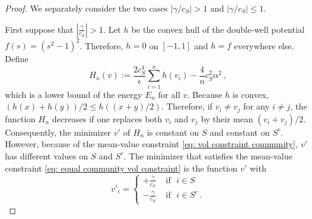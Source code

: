 \documentclass[10pt,a4paper]{amsart}
\def\ep{\epsilon}
\begin{document}
\begin{proof}

We separately consider the two cases $\left|{\gamma}/{c_S}\right| > 1$ and $\left|{\gamma}/{c_S}\right| \leq 1$. 

First suppose that $\left|\frac{\gamma}{c_S}\right| > 1$. 
Let $h$ be the convex hull of the double-well potential $f(s) = (s^2 - 1)^2$. Therefore, $h = 0$ on $[-1,1]$ and $h = f$ everywhere else. Define 
\begin{equation*}
    H_n(v) := \frac{2 c_S^4}{\ep} \sum_{i = 1}^n h(v_i) - \frac{4}{n} c_S^2 \alpha^2\,,
\end{equation*}
which is a lower bound of the energy $E_n$ for all $v$.
Because $h$ is convex, $(h(x) + h(y))/2 \leq h\left((x + y)/2\right)$. Therefore, if $v_i \neq v_j$ for any $i \neq j$, the function $H_n$ decreases if one replaces both $v_i$ and $v_j$ by their mean $(v_i + v_j)/2$.
Consequently, the minimizer $v'$ of $H_n$ is constant on $S$ and constant on $S^c$. However, because of the {mean-value constraint} \eqref{eq: vol constraint community}, $v'$ has different values on $S$ and $S^c$.
The minimizer that satisfies the {mean-value constraint} \eqref{eq: equal community vol constraint} is the function $v'$ with
\begin{equation}\label{eq: v'}
    v'_i = \begin{cases}
        +\frac{\gamma}{c_S} &\text{ if } \,\, i\in S 
        \\
        -\frac{\gamma}{c_S} &\text{ if } \,\, i\in S^c   \,.  
    \end{cases}
\end{equation}



\end{proof}
\end{document}
